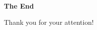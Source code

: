 \documentclass[t,aspectratio=169]{beamer}
\begin{document}

\begin{frame}

\vfill
\begin{center}
\textbf{\huge The End}

\bigskip
Thank you for your attention!
\end{center}
\vfill
\end{frame}
\end{document}

